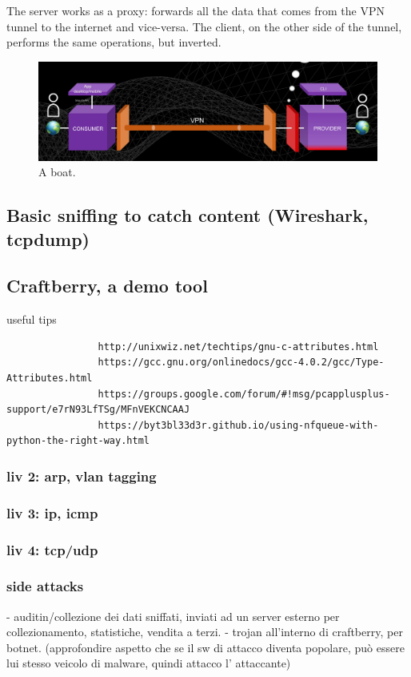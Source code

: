 \documentclass[]{article}
\begin{document}
	The server works as a proxy: forwards all the data that comes from the VPN tunnel to the internet and vice-versa.
	The client, on the other side of the tunnel, performs the same operations, but inverted. 

	\begin{figure}
		\includegraphics[width=\linewidth]{"images/client_server_vpn_connection.png"}
		\caption{A boat.}
		\label{fig:boat1}
	\end{figure}

	\subsection{Basic sniffing to catch content (Wireshark, tcpdump)}
	\subsection{Craftberry, a demo tool}
			useful tips
			\begin{verbatim}
				http://unixwiz.net/techtips/gnu-c-attributes.html
				https://gcc.gnu.org/onlinedocs/gcc-4.0.2/gcc/Type-Attributes.html
				https://groups.google.com/forum/#!msg/pcapplusplus-support/e7rN93LfTSg/MFnVEKCNCAAJ
				https://byt3bl33d3r.github.io/using-nfqueue-with-python-the-right-way.html
			\end{verbatim}
			
			\subsubsection{liv 2: arp, vlan tagging}
			\subsubsection{liv 3: ip, icmp}
			\subsubsection{liv 4: tcp/udp}
			\subsubsection{side attacks}
				- auditin/collezione dei dati sniffati, inviati ad un server esterno per collezionamento, statistiche, vendita a terzi.
				- trojan all'interno di craftberry, per botnet. (approfondire aspetto che se il sw di attacco diventa popolare, può essere lui stesso veicolo di malware, quindi attacco l' attaccante)
			
\end{document}
